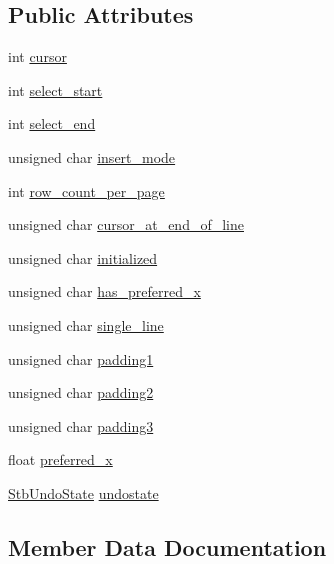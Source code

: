 \subsection*{Public Attributes}
\begin{DoxyCompactItemize}
\item 
int \hyperlink{structSTB__TexteditState_a7a1414f3286070306a5184f9473ccf9f}{cursor}
\item 
int \hyperlink{structSTB__TexteditState_a74d595403e0b6f99cd0163ee87f4344d}{select\+\_\+start}
\item 
int \hyperlink{structSTB__TexteditState_abf8b1b1064770e4579c5bb8c4a41d8f0}{select\+\_\+end}
\item 
unsigned char \hyperlink{structSTB__TexteditState_af26029a4f1f76d043afd35072fabcb4b}{insert\+\_\+mode}
\item 
int \hyperlink{structSTB__TexteditState_a352add1502f8e2f4e9043ab7114da61c}{row\+\_\+count\+\_\+per\+\_\+page}
\item 
unsigned char \hyperlink{structSTB__TexteditState_a0e7ba5f610f5dc2d643bef0f223ada9c}{cursor\+\_\+at\+\_\+end\+\_\+of\+\_\+line}
\item 
unsigned char \hyperlink{structSTB__TexteditState_a11a63150e95225aacd204d6ef160c0c0}{initialized}
\item 
unsigned char \hyperlink{structSTB__TexteditState_aaca2d581ed565f86288038816274e007}{has\+\_\+preferred\+\_\+x}
\item 
unsigned char \hyperlink{structSTB__TexteditState_a63299aca2cb4e009dfa41cda5e651316}{single\+\_\+line}
\item 
unsigned char \hyperlink{structSTB__TexteditState_a1e43e8ac88a8c7f2bba645b333a8bdc7}{padding1}
\item 
unsigned char \hyperlink{structSTB__TexteditState_af5a708e49f23f79bb14c9b0f4ad03371}{padding2}
\item 
unsigned char \hyperlink{structSTB__TexteditState_a4c42530e4919171df25b1f00bb95a887}{padding3}
\item 
float \hyperlink{structSTB__TexteditState_a527319df94e0fe262548fb48bebf3dea}{preferred\+\_\+x}
\item 
\hyperlink{structStbUndoState}{Stb\+Undo\+State} \hyperlink{structSTB__TexteditState_a7e1f0366bbd57e01a4f49a720beb9ead}{undostate}
\end{DoxyCompactItemize}


\subsection{Member Data Documentation}
\mbox{\label{structSTB__TexteditState_a7a1414f3286070306a5184f9473ccf9f}} 
